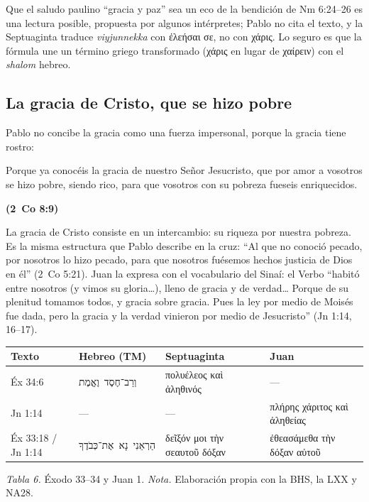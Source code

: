 \documentclass[11pt,letterpaper]{article}
\newcommand{\heb}[1]{\mbox{\foreignlanguage{hebrew}{#1}}}
\newcommand{\grc}[1]{\foreignlanguage{ancientgreek}{#1}}
\newcommand{\fuente}[1]{\par\hfill{\upshape\bfseries\small\textcolor{azul}{#1}}}
\begin{document}
\begin{nota}[Precisión]
Que el saludo paulino ``gracia y paz'' sea un eco de la bendición de Nm 6:24--26 es una lectura posible, propuesta por algunos intérpretes; Pablo no cita el texto, y la Septuaginta traduce \emph{viyjunnekka} con \grc{ἐλεήσαι σε}, no con \grc{χάρις}. Lo seguro es que la fórmula une un término griego transformado (\grc{χάρις} en lugar de \grc{χαίρειν}) con el \emph{shalom} hebreo.
\end{nota}

\subsection{La gracia de Cristo, que se hizo pobre}
Pablo no concibe la gracia como una fuerza impersonal, porque la gracia tiene rostro:

\begin{cita}Porque ya conocéis la gracia de nuestro Señor Jesucristo, que por amor a vosotros se hizo pobre, siendo rico, para que vosotros con su pobreza fueseis enriquecidos.\fuente{(2~Co 8:9)}\end{cita}

La gracia de Cristo consiste en un intercambio: su riqueza por nuestra pobreza. Es la misma estructura que Pablo describe en la cruz: ``Al que no conoció pecado, por nosotros lo hizo pecado, para que nosotros fuésemos hechos justicia de Dios en él'' (2~Co 5:21). Juan la expresa con el vocabulario del Sinaí: el Verbo ``habitó entre nosotros (y vimos su gloria\ldots), lleno de gracia y de verdad\ldots{} Porque de su plenitud tomamos todos, y gracia sobre gracia. Pues la ley por medio de Moisés fue dada, pero la gracia y la verdad vinieron por medio de Jesucristo'' (Jn 1:14, 16--17).

\begin{center}\small\renewcommand{\arraystretch}{1.22}
\begin{tabular}{@{}L{2.6cm}L{4.6cm}L{3.6cm}L{3.6cm}@{}}
\toprule
\textbf{Texto} & \textbf{Hebreo (TM)} & \textbf{Septuaginta} & \textbf{Juan} \\ \midrule
Éx 34:6 & \heb{וְרַב־חֶסֶד וֶאֱמֶת} & \grc{πολυέλεος καὶ ἀληθινός} & --- \\
Jn 1:14 & --- & --- & \grc{πλήρης χάριτος καὶ ἀληθείας} \\
Éx 33:18 / Jn 1:14 & \heb{הַרְאֵנִי נָא אֶת־כְּבֹדֶךָ} & \grc{δεῖξόν μοι τὴν σεαυτοῦ δόξαν} & \grc{ἐθεασάμεθα τὴν δόξαν αὐτοῦ} \\
\bottomrule
\end{tabular}\par
{\footnotesize\color{gris}\textit{Tabla 6.} Éxodo 33--34 y Juan 1. \textit{Nota.} Elaboración propia con la BHS, la LXX y NA28.}
\end{center}
\end{document}
